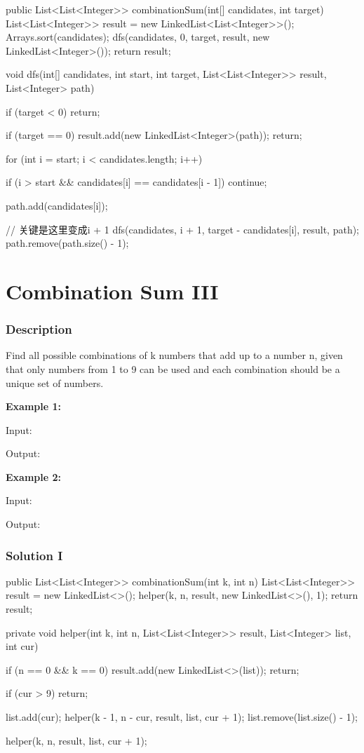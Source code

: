\begin{Code}
public List<List<Integer>> combinationSum(int[] candidates, int target) {
    List<List<Integer>> result = new LinkedList<List<Integer>>();
    Arrays.sort(candidates);
    dfs(candidates, 0, target, result, new LinkedList<Integer>());
    return result;
}

void dfs(int[] candidates, int start, int target, List<List<Integer>> result, List<Integer> path) {
    if (target < 0) {
        return;
    }

    if (target == 0) {
        result.add(new LinkedList<Integer>(path));
        return;
    }

    for (int i = start; i < candidates.length; i++) {
        if (i > start && candidates[i] == candidates[i - 1]) {
            continue;
        }

        path.add(candidates[i]);

        // 关键是这里变成i + 1
        dfs(candidates, i + 1, target - candidates[i], result, path);
        path.remove(path.size() - 1);
    }
}
\end{Code}

\newpage

\section{Combination Sum III} %

\subsubsection{Description}
Find all possible combinations of k numbers that add up to a number n, given that only numbers from 1 to 9 can be used and each combination should be a unique set of numbers.

\textbf{Example 1:}

Input: 

Output: \code{[[1,2,4]]}

\textbf{Example 2:}

Input: 

Output: \code{[[1,2,6], [1,3,5], [2,3,4]]}

\subsubsection{Solution I}

\begin{Code}
public List<List<Integer>> combinationSum(int k, int n) {
    List<List<Integer>> result = new LinkedList<>();
    helper(k, n, result, new LinkedList<>(), 1);
    return result;
}

private void helper(int k, int n, List<List<Integer>> result, List<Integer> list, int cur) {
    if (n == 0 && k == 0) {
        result.add(new LinkedList<>(list));
        return;
    }

    if (cur > 9) {
        return;
    }

    list.add(cur);
    helper(k - 1, n - cur, result, list, cur + 1);
    list.remove(list.size() - 1);

    helper(k, n, result, list, cur + 1);
}
\end{Code}

